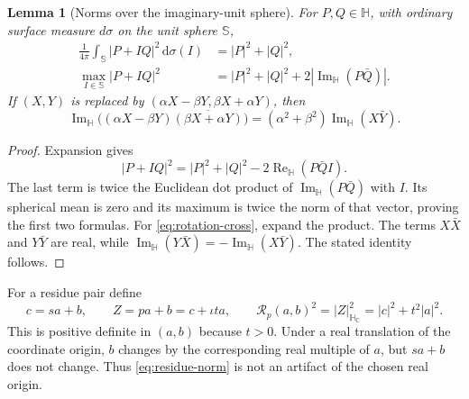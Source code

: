 \documentclass[11pt,a4paper]{article}
\numberwithin{equation}{section}
\newtheorem{lemma}[theorem]{Lemma}
\theoremstyle{definition}
\theoremstyle{remark}
\newcommand{\C}{\mathbb C}
\newcommand{\HH}{\mathbb H}
\newcommand{\HC}{\mathbb H_{\C}}
\newcommand{\SSS}{\mathbb S}
\newcommand{\ImH}{\operatorname{Im}_{\HH}}
\newcommand{\ReH}{\operatorname{Re}_{\HH}}
\newcommand{\dd}{\,\mathrm d}
\begin{document}
\begin{lemma}[Norms over the imaginary-unit sphere]\label{lem:sphere-norm}
For $P,Q\in\HH$, with ordinary surface measure $d\sigma$ on the unit
sphere $\SSS$,
\begin{align}
 \frac1{4\pi}\int_{\SSS}|P+IQ|^2\dd\sigma(I)
       &=|P|^2+|Q|^2,\label{eq:sphere-mean}\\
 \max_{I\in\SSS}|P+IQ|^2
       &=|P|^2+|Q|^2+2|\ImH(P\bar Q)|.\label{eq:sphere-max}
\end{align}
If $(X,Y)$ is replaced by
$(\alpha X-\beta Y,\beta X+\alpha Y)$, then
\begin{equation}
 \ImH\bigl((\alpha X-\beta Y)
              \overline{(\beta X+\alpha Y)}\bigr)
 =(\alpha^2+\beta^2)\ImH(X\bar Y).
 \label{eq:rotation-cross}
\end{equation}
\end{lemma}
\begin{proof}
Expansion gives
\[
 |P+IQ|^2=|P|^2+|Q|^2-2\ReH(P\bar Q I).
\]
The last term is twice the Euclidean dot product of $\ImH(P\bar Q)$
with $I$. Its spherical mean is zero and its maximum is twice the norm
of that vector, proving the first two formulas.
For \eqref{eq:rotation-cross}, expand the product. The terms
$X\bar X$ and $Y\bar Y$ are real, while
$\ImH(Y\bar X)=-\ImH(X\bar Y)$. The stated identity follows.
\end{proof}

For a residue pair define
\begin{equation}
 c=sa+b,\qquad Z=pa+b=c+\iota t a,\qquad
 \mathcal R_p(a,b)^2=|Z|_{\HC}^2=|c|^2+t^2|a|^2.
 \label{eq:residue-norm}
\end{equation}
This is positive definite in $(a,b)$ because $t>0$.
Under a real translation of the coordinate origin, $b$ changes by the
corresponding real multiple of $a$, but $sa+b$ does not change. Thus
\eqref{eq:residue-norm} is not an artifact of the chosen real origin.
\end{document}
